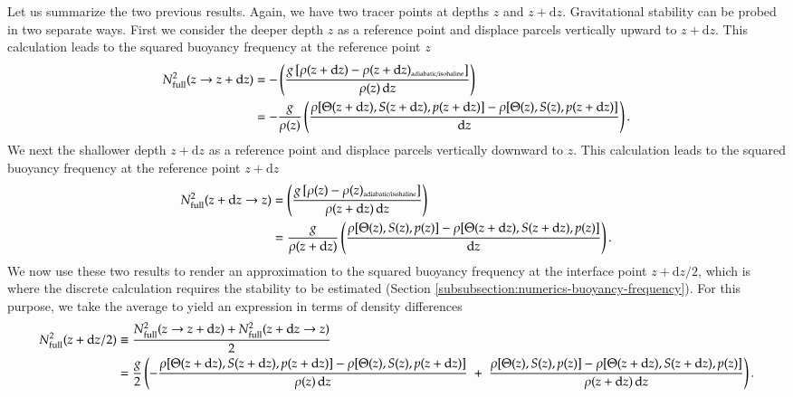 Let us summarize the two previous results.  Again, we have two tracer
points at depths $z$ and $z+\mathrm{d}z$.  Gravitational stability can
be probed in two separate ways. First we consider the deeper depth $z$
as a reference point and displace parcels vertically upward to
$z+\mathrm{d}z$.  This calculation leads to the squared buoyancy
frequency at the reference point $z$
\begin{equation}
\begin{split}
 N^{2}_{\mbox{\scriptsize full}}(z \rightarrow z + \mathrm{d}z)
 &=
 -\left(  \frac{g \, [\rho(z+\mathrm{d} z)  - \rho(z+\mathrm{d} z)_{\mbox{\tiny adiabatic/isohaline}} ]}{\rho(z)   \, \mathrm{d}z } \right)
\\
&=
 -\frac{g}{\rho(z)}  \left( 
 \frac{\rho[ \Theta(z + \mathrm{d} z), S(z + \mathrm{d} z), p(z + \mathrm{d} z)]
-
\rho[ \Theta(z), S(z), p(z + \mathrm{d}z)]
}{\mathrm{d}z}
\right).
\end{split}
\label{eq:infinitesimal-delta-rho-elements-upwards-summary}
\end{equation}
We next the shallower depth $z+\mathrm{d}z$ as a reference point and
displace parcels vertically downward to $z$.  This calculation leads
to the squared buoyancy frequency at the reference point
$z+\mathrm{d}z$
\begin{equation}
\begin{split}
 N^{2}_{\mbox{\scriptsize full}}(z + \mathrm{d}z \rightarrow z)
 &=
 \left(  \frac{g \, [\rho(z)  - \rho(z)_{\mbox{\tiny adiabatic/isohaline}}  ]}{\rho(z+\mathrm{d}z)   \, \mathrm{d}z } \right)  
 \\
 &=
 \frac{g}{\rho(z+\mathrm{d}z)}  \left( 
 \frac{ \rho[ \Theta(z), S(z), p(z)]-
 \rho[ \Theta(z+\mathrm{d}z), S(z+\mathrm{d}z), p(z)]
  }{\mathrm{d}z}
\right).
\end{split}
\label{eq:infinitesimal-delta-rho-elements-downward-summary}
\end{equation}
We now use these two results to render an approximation to the squared
buoyancy frequency at the interface point $z + \mathrm{d}z/2$, which
is where the discrete calculation requires the stability to be
estimated (Section \ref{subsubsection:numerics-buoyancy-frequency}).
For this purpose, we take the average to yield an expression in terms
of density differences \small
\begin{equation}
\begin{split}
N^{2}_{\mbox{\scriptsize full}}(z+\mathrm{d}z/2) 
 &\equiv 
 \frac{N^{2}_{\mbox{\scriptsize full}}(z \rightarrow z + \mathrm{d}z) + N^{2}_{\mbox{\scriptsize full}}(z + \mathrm{d}z \rightarrow z)}{2}
\\
&= \frac{g}{2} 
  \left( 
 -\frac{
    \rho[ \Theta(z + \mathrm{d} z), S(z + \mathrm{d} z), p(z + \mathrm{d} z)]
  -\rho[ \Theta(z), S(z), p(z + \mathrm{d}z)]
  }{\rho(z) \, \mathrm{d}z}
 \; + \; 
 \frac{ \rho[ \Theta(z), S(z), p(z)]-
 \rho[ \Theta(z+\mathrm{d}z), S(z+\mathrm{d}z), p(z)]
  }{\rho(z+\mathrm{d}z) \, \mathrm{d}z}
 \right).
\end{split}
\label{eq:n2-in-terms-of-density-differences}
\end{equation}
